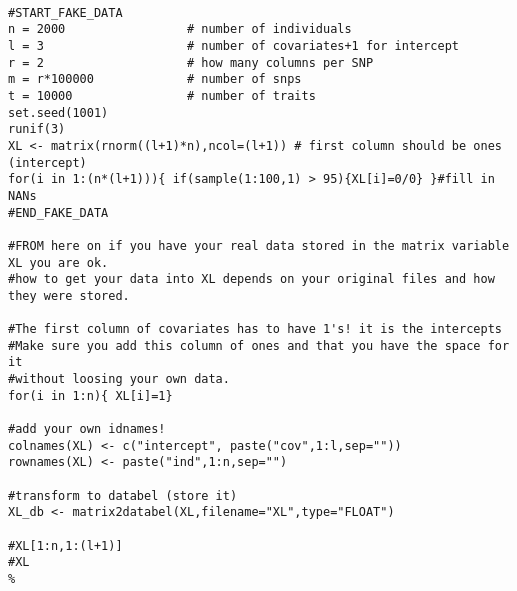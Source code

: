 \documentclass{report}
\begin{document}
\begin{lstlisting}[escapechar=\%]

#START_FAKE_DATA
n = 2000                 # number of individuals
l = 3                    # number of covariates+1 for intercept
r = 2                    # how many columns per SNP
m = r*100000             # number of snps
t = 10000                # number of traits
set.seed(1001)
runif(3)
XL <- matrix(rnorm((l+1)*n),ncol=(l+1)) # first column should be ones (intercept)
for(i in 1:(n*(l+1))){ if(sample(1:100,1) > 95){XL[i]=0/0} }#fill in NANs
#END_FAKE_DATA

#FROM here on if you have your real data stored in the matrix variable XL you are ok.
#how to get your data into XL depends on your original files and how they were stored.

#The first column of covariates has to have 1's! it is the intercepts
#Make sure you add this column of ones and that you have the space for it
#without loosing your own data.
for(i in 1:n){ XL[i]=1}

#add your own idnames!
colnames(XL) <- c("intercept", paste("cov",1:l,sep=""))
rownames(XL) <- paste("ind",1:n,sep="")

#transform to databel (store it)
XL_db <- matrix2databel(XL,filename="XL",type="FLOAT")

#XL[1:n,1:(l+1)]
#XL
%
\end{lstlisting}
\end{document}
